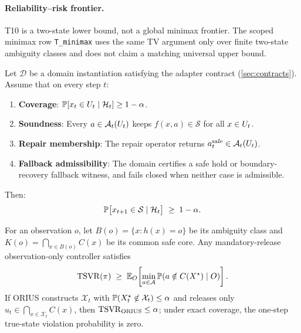 \paragraph{Reliability--risk frontier.}
T10 is a two-state lower bound, not a global minimax frontier.  The scoped
minimax row \texttt{T\_minimax} uses the same TV argument only over finite
two-state ambiguity classes and does not claim a matching universal upper bound.

\begin{theorem}\label{thm:T11}
Let $\mathcal{D}$ be a domain instantiation satisfying the adapter contract
(\cref{sec:contracts}).  Assume that on every step $t$:
\begin{enumerate}[nosep,label=(\roman*)]
  \item \textbf{Coverage}: $\operatorname{\mathbb{P}}[x_t \in U_t \mid \mathcal{H}_t] \ge 1 - \alpha$.
  \item \textbf{Soundness}: Every $a \in \mathcal{A}_t(U_t)$ keeps $f(x,a) \in \mathcal{S}$
        for all $x \in U_t$.
  \item \textbf{Repair membership}: The repair operator returns
        $a_t^{\mathrm{safe}} \in \mathcal{A}_t(U_t)$.
  \item \textbf{Fallback admissibility}: The domain certifies a safe hold or
        boundary-recovery fallback witness, and fails closed when neither case is
        admissible.
\end{enumerate}
Then:
\begin{equation}\label{eq:T11}
  \operatorname{\mathbb{P}}\bigl[x_{t+1} \in \mathcal{S} \mid \mathcal{H}_t\bigr] \;\ge\; 1 - \alpha.
\end{equation}
\end{theorem}

\begin{corollary}
\label{cor:T10_T11_observation_ambiguity_sandwich}
For an observation $o$, let
$B(o)=\{x:h(x)=o\}$ be its ambiguity class and
$K(o)=\bigcap_{x\in B(o)}C(x)$ be its common safe core.  Any mandatory-release
observation-only controller satisfies
\[
  \mathrm{TSVR}(\pi)
  \;\ge\;
  \mathbb{E}_{O}\!\left[
    \min_{a\in\mathcal{A}}
    \operatorname{\mathbb{P}}(a\notin C(X^\star)\mid O)
  \right].
\]
If ORIUS constructs $\mathcal{X}_t$ with
$\operatorname{\mathbb{P}}(X_t^\star\notin\mathcal{X}_t)\le\alpha$ and releases only
$u_t\in\bigcap_{x\in\mathcal{X}_t}C(x)$, then
$\mathrm{TSVR}_{\mathrm{ORIUS}}\le\alpha$; under exact coverage, the one-step
true-state violation probability is zero.
\end{corollary}

